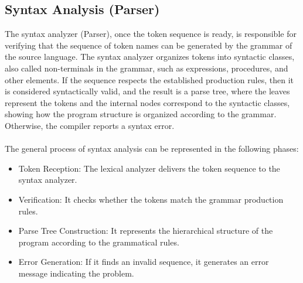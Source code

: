 \documentclass[letterpaper,12pt,oneside]{article}
\begin{document}
    \subsection{Syntax Analysis (Parser)}
    The syntax analyzer (Parser), once the token sequence is ready, is responsible for verifying that the sequence of token names can be generated by the grammar of the source language. The syntax analyzer organizes tokens into syntactic classes, also called non-terminals in the grammar, such as expressions, procedures, and other elements. If the sequence respects the established production rules, then it is considered syntactically valid, and the result is a parse tree, where the leaves represent the tokens and the internal nodes correspond to the syntactic classes, showing how the program structure is organized according to the grammar. Otherwise, the compiler reports a syntax error.\cite{aho2008compiladores}
    \\ \\
    The general process of syntax analysis can be represented in the following phases:
    \begin{itemize}
        \item Token Reception: The lexical analyzer delivers the token sequence to the syntax analyzer.
        \item Verification: It checks whether the tokens match the grammar production rules.
        \item Parse Tree Construction: It represents the hierarchical structure of the program according to the grammatical rules.
        \item Error Generation: If it finds an invalid sequence, it generates an error message indicating the problem.
    \end{itemize}
\end{document}
